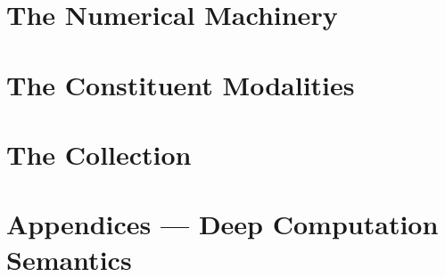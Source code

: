 \documentclass[11pt,letterpaper,oneside,openany]{memoir}
\begin{document}
\part{The Numerical Machinery}\label{part:machinery}















\part{The Constituent Modalities}\label{part:modalities}








\part{The Collection}\label{part:collection}





\appendix
\part{Appendices --- Deep Computation Semantics}\label{part:appendices}








\backmatter


\end{document}
